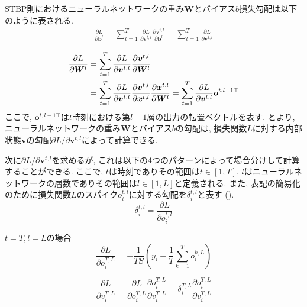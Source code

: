 STBP則におけるニューラルネットワークの重み$\bm{W}$とバイアス$b$損失勾配は以下のように表される.
\begin{align}
    \frac{\partial L}{\partial \bm{b}^l}
    = \sum_{t=1}^{T} \frac{\partial L}{\partial \bm{v}^{t,l}} \frac{\partial \bm{v}^{t,l}}{\partial \bm{b}^l}
    = \sum_{t=1}^{T} \frac{\partial L}{\partial \bm{v}^{t,l}} \label{eq:stbp:b}
\end{align}

\begin{align}
    \frac{\partial L}{\partial \bm{W}^{l}}
    &= \sum_{t=1}^{T} \frac{\partial L}{\partial \bm{v}^{t,l}} \frac{\partial \bm{v}^{t,l}}{\partial \bm{W}^{l}} \notag \\
    &= \sum_{t=1}^{T} \frac{\partial L}{\partial \bm{v}^{t,l}}  \frac{\partial \bm{v}^{t,l}} {\partial \bm{x}^{t,l}} \frac{\partial \bm{x}^{t,l}}{\partial \bm{W}^{l}} 
    = \sum_{t=1}^{T} \frac{\partial L}{\partial \bm{v}^{t,l}} \bm{o}^{t,l-1 \top} \label{eq:stbp:w}
\end{align}
ここで, $\bm{o}^{t,l-1 \top}$は$t$時刻における第$l-1$層の出力の転置ベクトルを表す.
とより, ニューラルネットワークの重み$\bm{W}$とバイアス$b$の勾配は, 損失関数$L$に対する内部状態$\bm{v}$の勾配$\partial L / \partial \bm{v}^{t,l}$によって計算できる.


次に$\partial L / \partial \bm{v}^{t,l}$を求めるが, これは以下の4つのパターンによって場合分けして計算することができる.
ここで, $t$は時刻でありその範囲は$t \in \left[1, T\right]$, $l$はニューラルネットワークの層数でありその範囲は$l \in \left[1, L\right]$と定義される.
また, 表記の簡易化のために損失関数$L$のスパイク$o_i^{t,l}$に対する勾配を$\delta_i^{t,l}$と表す ().
\begin{equation}
    \delta_i^{t,l} = \frac{\partial L}{\partial o_i^{t,l}} \label{eq:stbp:delta}
\end{equation}

$t=T, l=L$の場合
\begin{equation}
    \frac{\partial L}{\partial o_i^{T,L}}  = - \frac{1}{TS} (y_i -\frac{1}{T}\sum_{k=1}^{T} o_i^{k,L})
\end{equation}

\begin{equation}
    \frac{\partial L}{\partial v_i^{T,L}} 
    = \frac{\partial L}{\partial o_i^{T,L}} \frac{\partial o_i^{T,L}}{\partial v_i^{T,L}} 
    = \delta_i^{T,L} \frac{\partial o_i^{T,L}}{\partial v_i^{T,L}} \label{eq:stbp:v:case1}
\end{equation}

